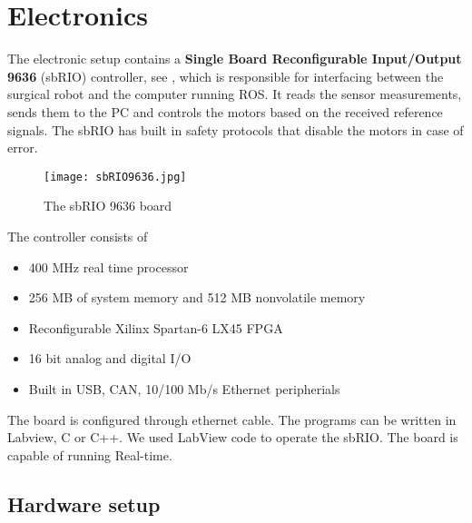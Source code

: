 \section{Electronics}\label{sec:electronics}

The electronic setup contains a \textbf{Single Board Reconfigurable Input/Output 9636} (sbRIO) controller, see , which is responsible for interfacing between the surgical robot and the computer running ROS. It reads the sensor measurements, sends them to the PC and controls the motors based on the received reference signals. The sbRIO has built in safety protocols that disable the motors in case of error.

\begin{figure}[H]
	\centering
		\centering
		\texttt{[image: sbRIO9636.jpg]}
		\caption{The sbRIO 9636 board\cite{sbRIO9636Pic}}
		\label{fig:sbRIO9636}
\end{figure}


The controller consists of
\begin{itemize}
	\item 400 MHz real time processor
	\item 256 MB of system memory and 512 MB nonvolatile memory
	\item Reconfigurable Xilinx Spartan-6 LX45 FPGA
	\item 16 bit analog and digital I/O
	\item Built in USB, CAN, 10/100 Mb/s Ethernet peripherials
\end{itemize}

The board is configured through ethernet cable. The programs can be written in Labview, C or C++. We used LabView code to operate the sbRIO. The board is capable of running Real-time. %


\subsection{Hardware setup}

